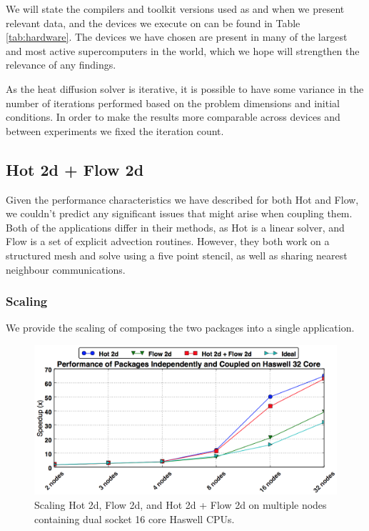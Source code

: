 \documentclass[runningheads,a4paper]{llncs}
\begin{document}
We will state the compilers and toolkit versions used as and when we present relevant data, and the devices we execute on can be found in Table \ref{tab:hardware}. The devices we have chosen are present in many of the largest and most active supercomputers in the world, which we hope will strengthen the relevance of any findings.

As the heat diffusion solver is iterative, it is possible to have some variance in the number of iterations performed based on the problem dimensions and initial conditions. In order to make the results more comparable across devices and between experiments we fixed the iteration count.

\subsection{Hot 2d + Flow 2d}

Given the performance characteristics we have described for both Hot and Flow, we couldn't predict any significant issues that might arise when coupling them. Both of the applications differ in their methods, as Hot is a linear solver, and Flow is a set of explicit advection routines. However, they both work on a structured mesh and solve using a five point stencil, as well as sharing nearest neighbour communications.

\subsubsection{Scaling}

We provide the scaling of composing the two packages into a single application.

\begin{figure}
  \centering
  \includegraphics[width=1.0\linewidth]{cpu_results}
  \caption{Scaling Hot 2d, Flow 2d, and Hot 2d + Flow 2d on multiple nodes containing dual socket 16 core Haswell CPUs.}
  \label{fig:scaling-hot-flow-haswell}
\end{figure}
\end{document}
